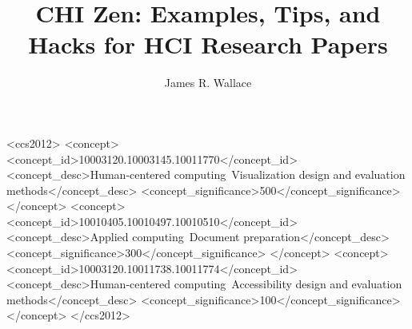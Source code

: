 \documentclass[sigconf,manuscript,screen]{acmart}
\begin{document}
\title[Examples, Tips, and Hacks for HCI Research Papers]{CHI Zen: Examples, Tips, and Hacks for HCI Research Papers}

\author{James R. Wallace}











\begin{CCSXML}
<ccs2012>
<concept>
<concept_id>10003120.10003145.10011770</concept_id>
<concept_desc>Human-centered computing~Visualization design and evaluation methods</concept_desc>
<concept_significance>500</concept_significance>
</concept>
<concept>
<concept_id>10010405.10010497.10010510</concept_id>
<concept_desc>Applied computing~Document preparation</concept_desc>
<concept_significance>300</concept_significance>
</concept>
<concept>
<concept_id>10003120.10011738.10011774</concept_id>
<concept_desc>Human-centered computing~Accessibility design and evaluation methods</concept_desc>
<concept_significance>100</concept_significance>
</concept>
</ccs2012>
\end{CCSXML}
\end{document}
